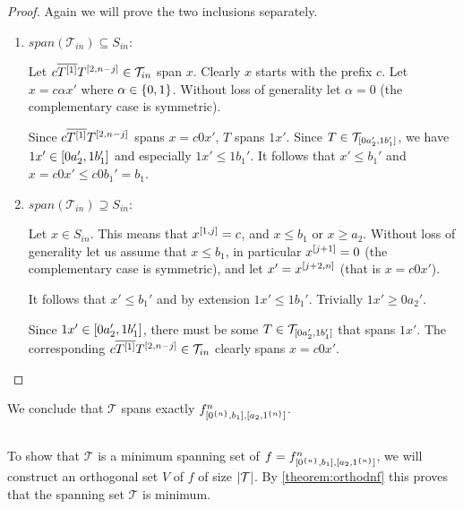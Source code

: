 \begin{proof}
Again
we will prove the two inclusions separately.
\begin{enumerate}
\item $span(\mathcal{T}_{in}) \subseteq S_{in}$:

Let $c \overline{T^{[1]}} T^{[2, n-j]} \in \mathcal{T}_{in}$ span $x$.
Clearly $x$ starts with the prefix $c$.
Let $x = c \alpha x'$ where $\alpha \in \{0, 1\}$.
Without loss of generality let $\alpha = 0$
(the complementary case is symmetric).

Since $c \overline{T^{[1]}} T^{[2, n-j]}$ spans
$x = c 0 x'$,
$T$ spans $1 x'$.
Since
$T \in \mathcal{T}_{[0 a_2', 1 b_1']}$,
we have $1 x' \in [0 a_2', 1 b_1']$
and especially $1 x' \leq 1 b_1'$.
It follows that $x' \leq b_1'$
and $x = c 0 x' \leq c 0 b_1' = b_1$.

\item $span(\mathcal{T}_{in}) \supseteq S_{in}$:

Let $x \in S_{in}$.
This means that $x^{[1, j]} = c$,
and $x \leq b_1$ or $x \geq a_2$.
Without loss of generality let
us assume that $x \leq b_1$,
in particular
$x^{[j+1]} = 0$
(the complementary case is symmetric),
and let $x' = x^{[j+2, n]}$
(that is $x = c 0 x'$).

It follows that $x'\leq b_1'$
and by extension $1 x' \leq 1 b_1'$.
Trivially $1 x' \geq 0 a_2'$.

Since $1 x' \in [0 a_2', 1 b_1']$,
there must be some
$T \in \mathcal{T}_{[0 a_2', 1 b_1']}$
that spans $1 x'$.
The corresponding
$c \overline{T^{[1]}} T^{[2, n-j]}
\in \mathcal{T}_{in}$ clearly spans $x = c 0 x'$.
\end{enumerate}
\end{proof}

We conclude that $\mathcal{T}$ spans exactly $f^{n}_{[0^{\{n\}}, b_1], [a_2, 1^{\{n\}}]}$.

\subsection{\titleoptimality}

To show that $\mathcal{T}$
is a minimum spanning set of $f = f^{n}_{[0^{\{n\}}, b_1], [a_2, 1^{\{n\}}]}$,
we will construct an orthogonal set $V$ of $f$
of size $\lvert\mathcal{T}\rvert$.
By \cref{theorem:orthodnf} this proves
that the spanning set $\mathcal{T}$ is minimum.

